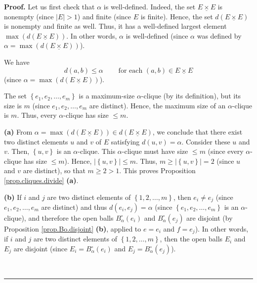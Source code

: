 \documentclass[numbers=enddot,12pt,final,onecolumn,notitlepage]{scrartcl}%
\theoremstyle{definition}
\newenvironment{proof}[1][Proof]{\noindent\textbf{#1.} }{\ \rule{0.5em}{0.5em}}
\newcommand{\timesu}{\mathbin{\underline{\times}}}
\renewcommand{\leq}{\leqslant}
\renewcommand{\geq}{\geqslant}
\theoremstyle{plainsl}
\begin{document}
\begin{proof}
Let us first check that $\alpha$ is well-defined. Indeed, the set $E\timesu E$
is nonempty (since $\left\vert E\right\vert >1$) and finite (since $E$ is
finite). Hence, the set $d\left(  E\timesu E\right)  $ is nonempty and finite
as well. Thus, it has a well-defined largest element $\max\left(  d\left(
E\timesu E\right)  \right)  $. In other words, $\alpha$ is well-defined (since
$\alpha$ was defined by $\alpha=\max\left(  d\left(  E\timesu E\right)
\right)  $).

We have
\begin{equation}
d\left(  a,b\right)  \leq\alpha\ \ \ \ \ \ \ \ \ \ \text{for each }\left(
a,b\right)  \in E\timesu E \label{pf.prop.cliques.divide.dleqa}%
\end{equation}
(since $\alpha=\max\left(  d\left(  E\timesu E\right)  \right)  $).

The set $\left\{  e_{1},e_{2},\ldots,e_{m}\right\}  $ is a maximum-size
$\alpha$-clique (by its definition), but its size is $m$ (since $e_{1}%
,e_{2},\ldots,e_{m}$ are distinct). Hence, the maximum size of an $\alpha
$-clique is $m$. Thus, every $\alpha$-clique has size $\leq m$. \medskip

\textbf{(a)} From $\alpha=\max\left(  d\left(  E\timesu E\right)  \right)  \in
d\left(  E\timesu E\right)  $, we conclude that there exist two distinct
elements $u$ and $v$ of $E$ satisfying $d\left(  u,v\right)  =\alpha$.
Consider these $u$ and $v$. Then, $\left\{  u,v\right\}  $ is an $\alpha
$-clique. This $\alpha$-clique must have size $\leq m$ (since every $\alpha
$-clique has size $\leq m$). Hence, $\left\vert \left\{  u,v\right\}
\right\vert \leq m$. Thus, $m\geq\left\vert \left\{  u,v\right\}  \right\vert
=2$ (since $u$ and $v$ are distinct), so that $m\geq2>1$. This proves
Proposition \ref{prop.cliques.divide} \textbf{(a)}. \medskip

\textbf{(b)} If $i$ and $j$ are two distinct elements of $\left\{
1,2,\ldots,m\right\}  $, then $e_{i}\neq e_{j}$ (since $e_{1},e_{2}%
,\ldots,e_{m}$ are distinct) and thus $d\left(  e_{i},e_{j}\right)  =\alpha$
(since $\left\{  e_{1},e_{2},\ldots,e_{m}\right\}  $ is an $\alpha$-clique),
and therefore the open balls $B_{\alpha}^{\circ}\left(  e_{i}\right)  $ and
$B_{\alpha}^{\circ}\left(  e_{j}\right)  $ are disjoint (by Proposition
\ref{prop.Bo.disjoint} \textbf{(b)}, applied to $e=e_{i}$ and $f=e_{j}$). In
other words, if $i$ and $j$ are two distinct elements of $\left\{
1,2,\ldots,m\right\}  $, then the open balls $E_{i}$ and $E_{j}$ are disjoint
(since $E_{i}=B_{\alpha}^{\circ}\left(  e_{i}\right)  $ and $E_{j}=B_{\alpha
}^{\circ}\left(  e_{j}\right)  $).


\end{proof}
\end{document}
